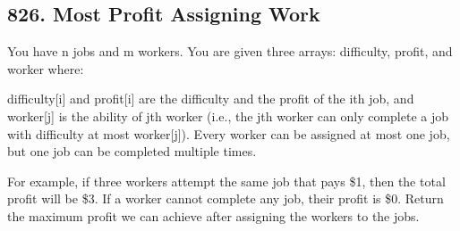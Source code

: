 \documentclass[9pt, b5paper]{article}
\begin{document}
\subsection{826. Most Profit Assigning Work}
\label{sec-5-7}
You have n jobs and m workers. You are given three arrays: difficulty, profit, and worker where:

difficulty[i] and profit[i] are the difficulty and the profit of the ith job, and
worker[j] is the ability of jth worker (i.e., the jth worker can only complete a job with difficulty at most worker[j]).
Every worker can be assigned at most one job, but one job can be completed multiple times.

For example, if three workers attempt the same job that pays \$1, then the total profit will be \$3. If a worker cannot complete any job, their profit is \$0.
Return the maximum profit we can achieve after assigning the workers to the jobs.
\end{document}
